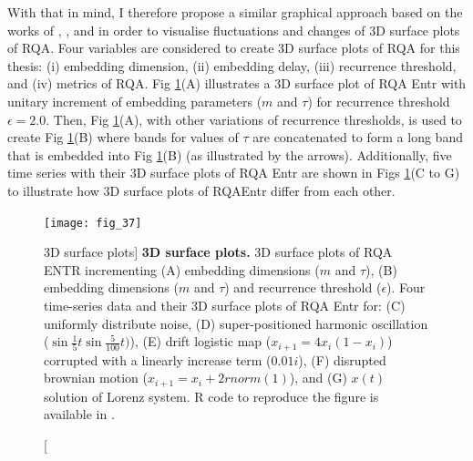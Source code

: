 With that in mind, I therefore propose a similar graphical approach 
based on the works of \cite{zbilut1992}, \cite{webber2018}, 
and \cite{marwan2015} in order to visualise fluctuations 
and changes of 3D surface plots of RQA.
Four variables are considered to create 3D surface 
plots of RQA for this thesis: 
(i) embedding dimension,
(ii) embedding delay,
(iii) recurrence threshold, and 
(iv) metrics of RQA. 
Fig \ref{fig:fig_37}(A) illustrates a 3D surface plot of RQA Entr  
with unitary increment of embedding parameters ($m$ and $\tau$)
for recurrence threshold $\epsilon=2.0$.
Then, Fig \ref{fig:fig_37}(A), with other variations of recurrence thresholds, 
is used to create Fig \ref{fig:fig_37}(B) where bands 
for values of $\tau$ are concatenated to form a long band
that is embedded into Fig \ref{fig:fig_37}(B) 
(as illustrated by the arrows).
Additionally, five time series with their 3D surface plots of 
RQA Entr are shown in Figs \ref{fig:fig_37}(C to G)
to illustrate how 3D surface plots of RQAEntr differ from each other.
\begin{figure}
  \centering
    \texttt{[image: fig\_37]}
    \caption
	[3D surface plots]{
	{\bf 3D surface plots.} 
	3D surface plots of RQA ENTR incrementing 
	(A) embedding dimensions ($m$ and $\tau$),
	(B) embedding dimensions ($m$ and $\tau$) and
	recurrence threshold ($\epsilon$).
	Four time-series data and their 3D surface plots of 
	RQA Entr for:
	(C) uniformly distribute noise,
	(D) super-positioned harmonic oscillation 
	($\sin{ \frac{1}{5} t} \sin{ \frac{5}{100}t) }$),
	(E) drift logistic map ($x_{i+1} = 4 x_i (1- x_i) $) corrupted 
	with a linearly increase term ($0.01 i$),
	(F) disrupted brownian motion  ($x_{i+1} = x_i + 2rnorm(1) $), and
	(G) $x(t)$ solution of Lorenz system.
	R code to reproduce the figure is available in \cite{xochicale2018}.
	}
    \label{fig:fig_37}
\end{figure}

